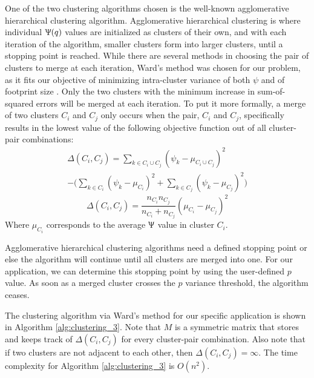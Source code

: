 \documentclass[conference]{IEEEtran}
\theoremstyle{plain}%
\begin{document}
One of the two clustering algorithms chosen is the well-known agglomerative hierarchical clustering algorithm. Agglomerative hierarchical clustering is where individual $\Uppsi(q)$ values are initialized as clusters of their own, and with each iteration of the algorithm, smaller clusters form into larger clusters, until a stopping point is reached. While there are several methods in choosing the pair of clusters to merge at each iteration, Ward's method was chosen for our problem, as it fits our objective of minimizing intra-cluster variance of both $\psi$ and of footprint size \cite{ward1963hierarchical}. Only the two clusters with the minimum increase in sum-of-squared errors will be merged at each iteration. To put it more formally, a merge of two clusters $C_i$ and $C_j$ only occurs when the pair, $C_i$ and $C_j$, specifically results in the lowest value of the following objective function out of all cluster-pair combinations:
\begin{multline} \label{eq:ward_formula}
\Delta(C_i,C_j) = \sum_{k \in C_i \cup C_j} ( \psi_k - \mu_{C_i \cup C_j} )^2 \\
 - \Big( \sum_{k \in C_i} ( \psi_k - \mu_{C_i} )^2 + \sum_{k \in C_j} ( \psi_k - \mu_{C_j} )^2 \Big)
\end{multline}
\begin{equation}
\Delta(C_i,C_j) = \frac{n_{C_i}n_{C_j}}{n_{C_i} + n_{C_j}} (\mu_{C_i} - \mu_{C_j})^2
\end{equation}
Where $\mu_{C_i}$ corresponds to the average $\Uppsi$ value in cluster $C_i$.

Agglomerative hierarchical clustering algorithms need a defined stopping point or else the algorithm will continue until all clusters are merged into one. For our application, we can determine this stopping point by using the user-defined $p$ value. As soon as a merged cluster crosses the $p$ variance threshold, the algorithm ceases.

The clustering algorithm via Ward's method for our specific application is shown in Algorithm \ref{alg:clustering_3}. Note that $M$ is a symmetric matrix that stores and keeps track of $\Delta(C_i,C_j)$ for every cluster-pair combination. Also note that if two clusters are not adjacent to each other, then $\Delta(C_i,C_j) = \infty$. The time complexity for Algorithm \ref{alg:clustering_3} is $O(n^2)$.
\end{document}
